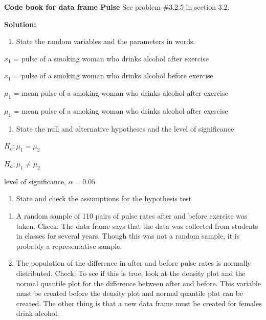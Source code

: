 \documentclass[
]{book}
\providecommand{\tightlist}{%
  \setlength{\itemsep}{0pt}\setlength{\parskip}{0pt}}
\begin{document}
\textbf{Code book for data frame Pulse} See problem \#3.2.5 in section 3.2.

\textbf{Solution:}

\begin{enumerate}
\def\labelenumi{\arabic{enumi}.}
\tightlist
\item
  State the random variables and the parameters in words.
\end{enumerate}

\(x_1\) = pulse of a smoking woman who drinks alcohol after exercise

\(x_1\) = pulse of a smoking woman who drinks alcohol before exercise

\(\mu_1\) = mean pulse of a smoking woman who drinks alcohol after exercise

\(\mu_1\) = mean pulse of a smoking woman who drinks alcohol after exercise

\begin{enumerate}
\def\labelenumi{\arabic{enumi}.}
\setcounter{enumi}{1}
\tightlist
\item
  State the null and alternative hypotheses and the level of significance
\end{enumerate}

\(H_o: \mu_1=\mu_2\)

\(H_a: \mu_1\ne \mu_2\)

level of significance, \(\alpha=0.05\)

\begin{enumerate}
\def\labelenumi{\arabic{enumi}.}
\setcounter{enumi}{2}
\tightlist
\item
  State and check the assumptions for the hypothesis test
\end{enumerate}

\begin{enumerate}
\def\labelenumi{\alph{enumi}.}
\item
  A random sample of 110 pairs of pulse rates after and before exercise was taken. Check: The data frame says that the data was collected from students in classes for several years. Though this was not a random sample, it is probably a representative sample.
\item
  The population of the difference in after and before pulse rates is normally distributed. Check: To see if this is true, look at the density plot and the normal quantile plot for the difference between after and before. This variable must be created before the density plot and normal quantile plot can be created. The other thing is that a new data frame must be created for females drink alcohol.
\end{enumerate}
\end{document}
